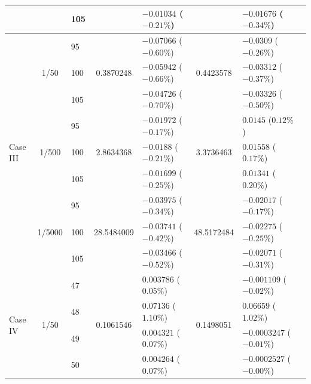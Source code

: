 \begin{table}[htbp]
{\begin{tabular}{lclclclc}
    &                         & 105  &                           & $-0.01034$ ($-0.21\%$)    &                           & $-0.01676$ ($-0.34\%$)    \\
    \midrule
    \multirow{9}{*}{Case III}
    & \multirow{3}{*}{1/50}  & 95  & \multirow{3}{*}{0.3870248}  & $-0.07066$ ($-0.60\%$)   & \multirow{3}{*}{0.4423578} & $-0.0309$ ($-0.26\%$)     \\
    &                         & 100 &                           & $-0.05942$ ($-0.66\%$)     &                           & $-0.03312$ ($-0.37\%$)   \\
    &                         & 105 &                           & $-0.04726$ ($-0.70\%$)    &                           & $-0.03326$ ($-0.50\%$)     \\
    \cmidrule(lr){2-7}
    & \multirow{3}{*}{1/500} & 95 & \multirow{3}{*}{2.8634368}  & $-0.01972$ ($-0.17\%$)  & \multirow{3}{*}{3.3736463} & $0.0145$ ($0.12\%$)   \\
    &                         & 100 &                           & $-0.0188$ ($-0.21\%$)   &                           & $0.01558$ ($0.17\%$)    \\
    &                         & 105  &                           & $-0.01699$ ($-0.25\%$)   &                           & $0.01341$ ($0.20\%$)   \\
    \cmidrule(lr){2-7}
    & \multirow{3}{*}{1/5000}& 95 & \multirow{3}{*}{28.5484009}& $-0.03975$ ($-0.34\%$)  & \multirow{3}{*}{48.5172484} & $-0.02017$ ($-0.17\%$)   \\
    &                         & 100 &                           & $-0.03741$ ($-0.42\%$)   &                           & $-0.02275$ ($-0.25\%$)    \\
    &                         & 105  &                           & $-0.03466$ ($-0.52\%$)    &                           & $-0.02071$ ($-0.31\%$)   \\
    \midrule
    \multirow{15}{*}{Case IV}
    & \multirow{5}{*}{1/50}  & 47 & \multirow{5}{*}{0.1061546} & $0.003786$ ($0.05\%$)     & \multirow{5}{*}{0.1498051} & $-0.001109$ ($-0.02\%$)   \\
    &                        & 48 &                          & $0.07136$ ($1.10\%$)     &                          & $0.06659$ ($1.02\%$)   \\
    &                        & 49 &                          & $0.004321$ ($0.07\%$)     &                          & $-0.0003247$ ($-0.01\%$)     \\
    &                        & 50 &                          & $0.004264$ ($0.07\%$)     &                          & $-0.0002527$ ($-0.00\%$)     \\

\end{tabular}}
\end{table}
